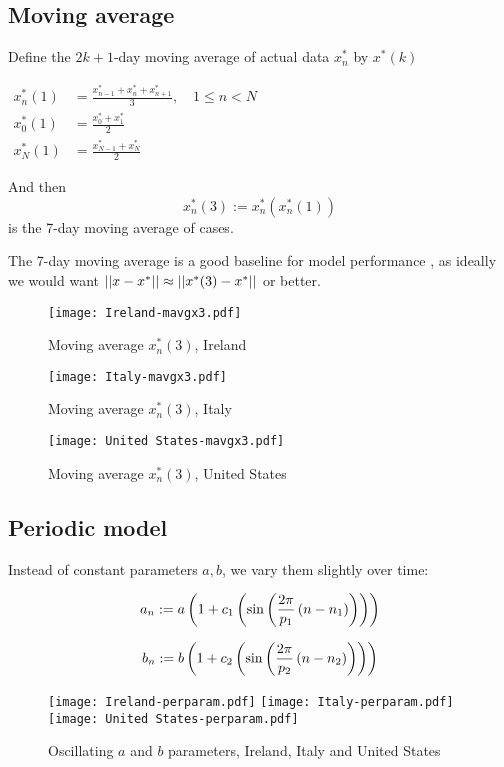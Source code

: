 \subsection{Moving average}

Define the $2k+1$-day moving average of actual data $x_n^*$ by $x^*(k)$

$\begin{aligned}
x^*_n(1) &=\frac{x^*_{n-1} + x^*_n + x^*_{n+1}}{3},\quad 1\leq n < N \\
x^*_0(1) &=\frac{x^*_0 + x^*_1}{2}\\
x^*_N(1) &=\frac{x^*_{N-1} + x^*_N}{2}
\end{aligned}$

And then $$x_n^*(3):= x^*_n(x^*_n(1))$$ is the 7-day moving average of cases.

The 7-day moving average is a good baseline for model performance , as ideally we would want $\left|\left|x-x^*\right|\right|\approx\left|\left|x^*(3)-x^*\right|\right|$ or better.

\begin{figure}[H]
\texttt{[image: Ireland-mavgx3.pdf]}
\caption{Moving average $x^*_n (3)$, Ireland}
\endminipage 
{}
\texttt{[image: Italy-mavgx3.pdf]}
\caption{Moving average $x^*_n (3)$, Italy}
\endminipage 
{}
\texttt{[image: United States-mavgx3.pdf]}
\caption{Moving average $x^*_n (3)$, United States}
\endminipage 
\end{figure}

\subsection{Periodic model}\label{ch:periodic}

Instead of constant parameters $a,b$, we vary them slightly over time:

\begin{equation} \label{eq:anper}
a_n := a\left(1+c_1\left(\sin\left(\frac{2\pi}{p_1}\left(n-n_1\right)\right)\right)\right)
\end{equation}

\begin{equation} \label{eq:bnper}
b_n := b\left(1+c_2\left(\sin\left(\frac{2\pi}{p_2}\left(n-n_2\right)\right)\right)\right)
\end{equation}

\begin{figure}[H]
  \texttt{[image: Ireland-perparam.pdf]} \label{fig:ireland-perparam}
\endminipage\hfill
{}
  \texttt{[image: Italy-perparam.pdf]} \label{fig:italy-perparam}
\endminipage\hfill
{}
  \texttt{[image: United States-perparam.pdf]} \label{fig:usa-perparam}
\endminipage\hfill
\caption{Oscillating $a$ and $b$ parameters, Ireland, Italy and United States}
\end{figure}

